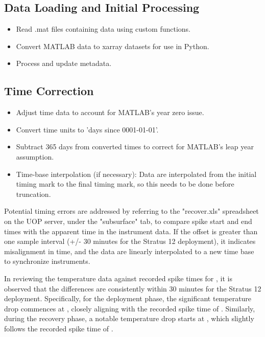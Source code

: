 \subsection{Data Loading and Initial Processing}
\begin{itemize}
\item Read .mat files containing \FirstInstrumentType{} data using custom functions.
\item Convert MATLAB data to xarray datasets for use in Python.
\item Process and update metadata.
\end{itemize}

\subsection{Time Correction}
\begin{itemize}
\item Adjust time data to account for MATLAB's year zero issue.
\item Convert time units to 'days since 0001-01-01'.
\item Subtract 365 days from converted times to correct for MATLAB's leap year assumption.
\item Time-base interpolation (if necessary): Data are interpolated from the initial timing mark to the final timing mark, 
so this needs to be done before truncation.
\end{itemize}

Potential timing errors are addressed by referring to the "recover.xls" spreadsheet on the UOP server, 
under the "subsurface" tab, to compare spike start and end times with the apparent time in the instrument data. 
If the offset is greater than one sample interval (+/- 30 minutes for the Stratus 12 deployment),
it indicates misalignment in time, and the data are linearly interpolated to a new time base to synchronize instruments.

In reviewing the temperature data against recorded spike times for \displayprojectname{} \casenumber{}, it is observed
that the differences are consistently within 30 minutes for the Stratus 12 deployment. Specifically, for the deployment phase,
the significant temperature drop commences at \DeploymentSpike{}, closely aligning with
the recorded spike time of \DeploymentRecordedSpike{}. 
Similarly, during the recovery phase, a notable temperature drop starts at \RecoverySpike{}, 
which slightly follows the recorded spike time of \RecoveryRecordedSpike{}.

